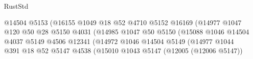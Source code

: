 \begin{lexlean}{RustStd}
\begin{coremodule}
                                                  @14504
                                                  @5153
                                                  (@16155
                                                    @1049
                                                    @18
                                                    @52
                                                    @4710
                                                    @5152
                                                    @16169
                                                    (@14977
                                                      @1047
                                                      @120
                                                      @50
                                                      @28
                                                      @5150
                                                      @4031
                                                      (@14985
                                                        @1047
                                                        @50
                                                        @5150
                                                        (@15088
                                                          @1046
                                                          @14504
                                                          @4037
                                                          @5149
                                                          @4506
                                                          @12341
                                                          (@14972
                                                            @1046
                                                            @14504
                                                            @5149
                                                            (@14977
                                                              @1044
                                                              @391
                                                              @18
                                                              @52
                                                              @5147
                                                              @4538
                                                              (@15010
                                                                @1043
                                                                @5147
                                                                (@12005 (@12006 @5147))

\end{coremodule}
\end{lexlean}
